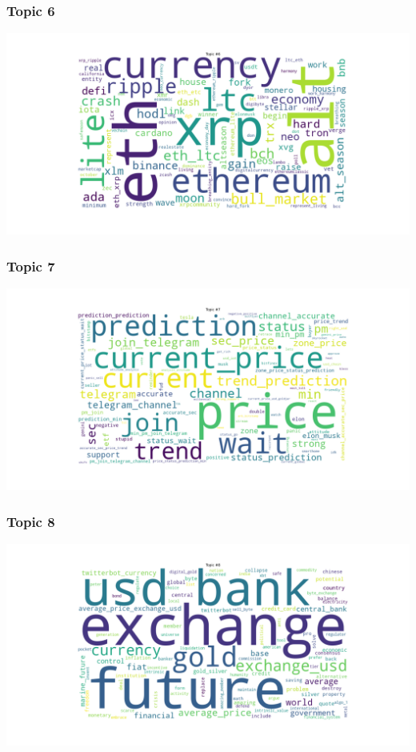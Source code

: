 \documentclass[
]{article}
\begin{document}
\hypertarget{topic-6}{%
\subsubsection{Topic 6}\label{topic-6}}

\includegraphics[width=7.8125in,height=\textheight]{images/03 - Topic_6.png}

\hypertarget{topic-7}{%
\subsubsection{Topic 7}\label{topic-7}}

\includegraphics[width=7.8125in,height=\textheight]{images/03 - Topic_7.png}

\hypertarget{topic-8}{%
\subsubsection{Topic 8}\label{topic-8}}

\includegraphics[width=7.8125in,height=\textheight]{images/03 - Topic_8.png}
\end{document}
